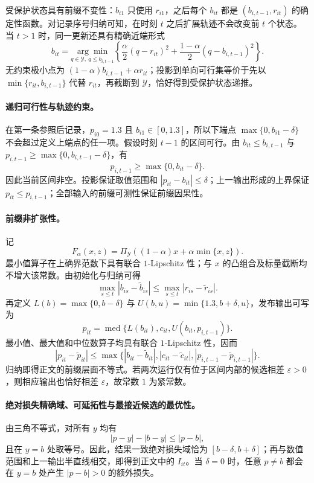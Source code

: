 \documentclass[UTF8,11pt]{ctexart}
\begin{document}
受保护状态具有前缀不变性：\(b_{i1}\) 只使用 \(r_{i1}\)，之后每个 \(b_{it}\) 都是 \((b_{i,t-1},r_{it})\) 的确定性函数。对记录序号归纳可知，在时刻 \(t\) 之后扩展轨迹不会改变前 \(t\) 个状态。当 \(t>1\) 时，同一更新还具有精确近端形式
\begin{equation}
 b_{it}=\underset{q\in\mathcal Y,\ q\leq b_{i,t-1}}{\arg\min}
 \left\{\frac{\alpha}{2}(q-r_{it})^2+
 \frac{1-\alpha}{2}(q-b_{i,t-1})^2\right\}.
 \label{eq:supp_protected_proximal_zh}
\end{equation}
无约束极小点为 \((1-\alpha)b_{i,t-1}+\alpha r_{it}\)；投影到单向可行集等价于先以 \(\min\{r_{it},b_{i,t-1}\}\) 代替 \(r_{it}\)，再截断到 \(\mathcal Y\)，恰好得到受保护状态递推。

\paragraph{递归可行性与轨迹约束。}
在第一条参照后记录，\(p_{i0}=1.3\) 且 \(b_{i1}\in[0,1.3]\)，所以下端点 \(\max\{0,b_{i1}-\delta\}\) 不会超过定义上端点的任一项。假设时刻 \(t-1\) 的区间可行。由 \(b_{it}\leq b_{i,t-1}\) 与 \(p_{i,t-1}\geq\max\{0,b_{i,t-1}-\delta\}\)，有
\[
 p_{i,t-1}\geq\max\{0,b_{it}-\delta\}.
\]
因此当前区间非空。投影保证取值范围和 \(|p_{it}-b_{it}|\leq\delta\)；上一输出形成的上界保证 \(p_{it}\leq p_{i,t-1}\)；全部输入的前缀可测性保证前缀因果性。

\paragraph{前缀非扩张性。}
记
\[
 F_\alpha(x,z)=\Pi_{\mathcal Y}\!\left((1-\alpha)x+\alpha\min\{x,z\}\right).
\]
最小值算子在上确界范数下具有联合 \(1\)-Lipschitz 性；与 \(x\) 的凸组合及标量截断均不增大该常数。由初始化与归纳可得
\[
 \max_{s\leq t}|b_{is}-\widetilde b_{is}|
 \leq\max_{s\leq t}|r_{is}-\widetilde r_{is}|.
\]
再定义 \(L(b)=\max\{0,b-\delta\}\) 与 \(U(b,u)=\min\{1.3,b+\delta,u\}\)，发布输出可写为
\[
 p_{it}=\operatorname{med}\{L(b_{it}),c_{it},U(b_{it},p_{i,t-1})\}.
\]
最小值、最大值和中位数算子均具有联合 \(1\)-Lipschitz 性，因而
\[
 |p_{it}-\widetilde p_{it}|
 \leq\max\{|b_{it}-\widetilde b_{it}|,
 |c_{it}-\widetilde c_{it}|,
 |p_{i,t-1}-\widetilde p_{i,t-1}|\}.
\]
归纳即得正文的前缀层面不等式。若两次运行仅有位于区间内部的候选相差 \(\varepsilon>0\)，则相应输出也恰好相差 \(\varepsilon\)，故常数 \(1\) 为紧常数。

\paragraph{绝对损失精确域、可延拓性与最接近候选的最优性。}
由三角不等式，对所有 \(y\) 均有
\[
 |p-y|-|b-y|\leq|p-b|,
\]
且在 \(y=b\) 处取等号。因此，结果一致绝对损失域恰为 \([b-\delta,b+\delta]\)；再与数值范围和上一输出半直线相交，即得到正文中的 \(I_{it}\)。当 \(\delta=0\) 时，任意 \(p\neq b\) 都会在 \(y=b\) 处产生 \(|p-b|>0\) 的额外损失。
\end{document}

